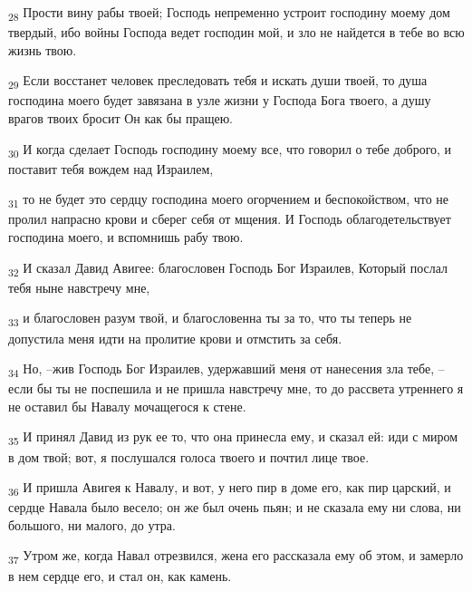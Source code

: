 \begin{tcolorbox}
\textsubscript{28} Прости вину рабы твоей; Господь непременно устроит господину моему дом твердый, ибо войны Господа ведет господин мой, и зло не найдется в тебе во всю жизнь твою.
\end{tcolorbox}
\begin{tcolorbox}
\textsubscript{29} Если восстанет человек преследовать тебя и искать души твоей, то душа господина моего будет завязана в узле жизни у Господа Бога твоего, а душу врагов твоих бросит Он как бы пращею.
\end{tcolorbox}
\begin{tcolorbox}
\textsubscript{30} И когда сделает Господь господину моему все, что говорил о тебе доброго, и поставит тебя вождем над Израилем,
\end{tcolorbox}
\begin{tcolorbox}
\textsubscript{31} то не будет это сердцу господина моего огорчением и беспокойством, что не пролил напрасно крови и сберег себя от мщения. И Господь облагодетельствует господина моего, и вспомнишь рабу твою.
\end{tcolorbox}
\begin{tcolorbox}
\textsubscript{32} И сказал Давид Авигее: благословен Господь Бог Израилев, Который послал тебя ныне навстречу мне,
\end{tcolorbox}
\begin{tcolorbox}
\textsubscript{33} и благословен разум твой, и благословенна ты за то, что ты теперь не допустила меня идти на пролитие крови и отмстить за себя.
\end{tcolorbox}
\begin{tcolorbox}
\textsubscript{34} Но, --жив Господь Бог Израилев, удержавший меня от нанесения зла тебе, --если бы ты не поспешила и не пришла навстречу мне, то до рассвета утреннего я не оставил бы Навалу мочащегося к стене.
\end{tcolorbox}
\begin{tcolorbox}
\textsubscript{35} И принял Давид из рук ее то, что она принесла ему, и сказал ей: иди с миром в дом твой; вот, я послушался голоса твоего и почтил лице твое.
\end{tcolorbox}
\begin{tcolorbox}
\textsubscript{36} И пришла Авигея к Навалу, и вот, у него пир в доме его, как пир царский, и сердце Навала было весело; он же был очень пьян; и не сказала ему ни слова, ни большого, ни малого, до утра.
\end{tcolorbox}
\begin{tcolorbox}
\textsubscript{37} Утром же, когда Навал отрезвился, жена его рассказала ему об этом, и замерло в нем сердце его, и стал он, как камень.
\end{tcolorbox}
